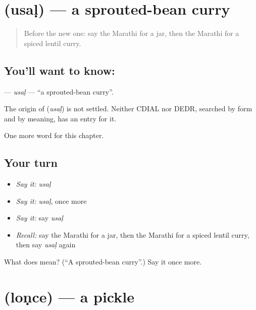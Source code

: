 \section[\texorpdfstring{\mr{उसळ} (usaḷ)}{उसळ (usaḷ)}]{ (usaḷ) — a sprouted-bean curry}

\label{lesson:MR-C269-usal}



\begin{quote}
Before the new one: say the Marathi for a jar, then the Marathi for a spiced lentil curry.
\end{quote}

\subsection*{You'll want to know: }
\textbf{} — \emph{usaḷ} — \textquotedblleft{}a sprouted-bean curry\textquotedblright{}.

\begin{cousinweb}
The origin of \textbf{} (\emph{usaḷ}) is not settled. Neither CDIAL nor DEDR, searched by form and by meaning, has an entry for it.
\end{cousinweb}

\begin{grammarlens}[title={What you've built}]
One more word for this chapter.
\end{grammarlens}

\subsection*{Your turn}
\begin{itemize}
\raggedright
  \item \emph{Say it:} \emph{usaḷ}
  \item \emph{Say it:} \emph{usaḷ}, once more
  \item \emph{Say it:} say \emph{usaḷ}
  \item \emph{Recall:} say the Marathi for a jar, then the Marathi for a spiced lentil curry, then say \emph{usaḷ} again
\end{itemize}

\begin{tcolorbox}[breakable,colback=teal!4,colframe=teal!35!black,title={Before you move on}]
What does  mean? (\textquotedblleft{}A sprouted-bean curry\textquotedblright{}.) Say it once more.
\end{tcolorbox}
\section[\texorpdfstring{\mr{लोणचे} (loṇce)}{लोणचे (loṇce)}]{ (loṇce) — a pickle}

